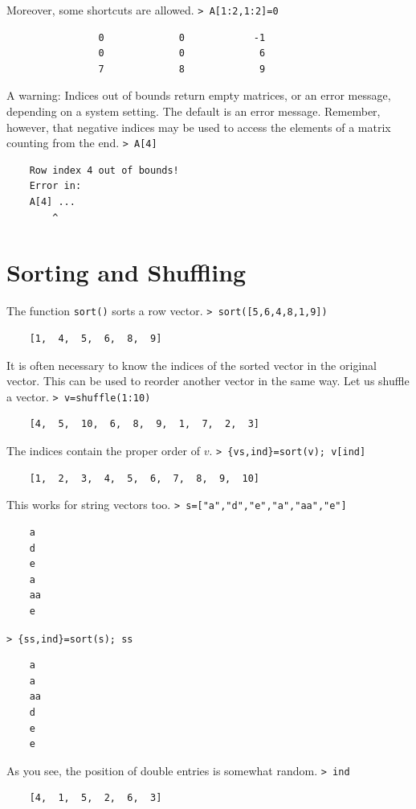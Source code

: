 \documentclass[11pt, a4paper]{article}
\newcommand{\emtcmd}[1]{\noindent\texttt{\textcolor{emtcommand}{>}\ #1}\par\smallskip}
\begin{document}
Moreover, some shortcuts are allowed.
\emtcmd{A[1:2,1:2]=0}
\begin{verbatim}
                0             0            -1
                0             0             6
                7             8             9
\end{verbatim}

A warning: Indices out of bounds return empty matrices, or an error message, depending on a system setting. The default is an error message. Remember, however, that negative indices may be used to access the elements of a matrix counting from the end.
\emtcmd{A[4]}
\begin{verbatim}
    Row index 4 out of bounds!
    Error in:
    A[4] ...
        ^
\end{verbatim}

\section*{Sorting and Shuffling}

The function \texttt{sort()} sorts a row vector.
\emtcmd{sort([5,6,4,8,1,9])}
\begin{verbatim}
    [1,  4,  5,  6,  8,  9]
\end{verbatim}

It is often necessary to know the indices of the sorted vector in the original vector. This can be used to reorder another vector in the same way. Let us shuffle a vector.
\emtcmd{v=shuffle(1:10)}
\begin{verbatim}
    [4,  5,  10,  6,  8,  9,  1,  7,  2,  3]
\end{verbatim}

The indices contain the proper order of $v$.
\emtcmd{\{vs,ind\}=sort(v); v[ind]}
\begin{verbatim}
    [1,  2,  3,  4,  5,  6,  7,  8,  9,  10]
\end{verbatim}

This works for string vectors too.
\emtcmd{s=["a","d","e","a","aa","e"]}
\begin{verbatim}
    a
    d
    e
    a
    aa
    e
\end{verbatim}
\emtcmd{\{ss,ind\}=sort(s); ss}
\begin{verbatim}
    a
    a
    aa
    d
    e
    e
\end{verbatim}

As you see, the position of double entries is somewhat random.
\emtcmd{ind}
\begin{verbatim}
    [4,  1,  5,  2,  6,  3]
\end{verbatim}
\end{document}
